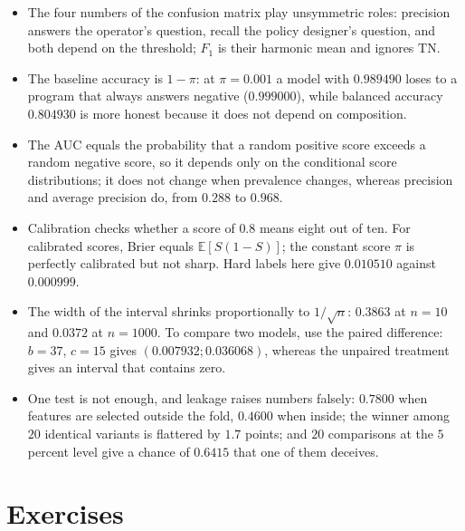 \begin{ringkasan}
\begin{itemize}
  \item The four numbers of the confusion matrix play unsymmetric roles: precision answers the
        operator's question, recall the policy designer's question, and both depend on the
        threshold; $F_1$ is their harmonic mean and ignores $\mathrm{TN}$.
  \item The baseline accuracy is $1-\pi$: at $\pi=0.001$ a model with $0.989490$ loses to a program
        that always answers negative ($0.999000$), while balanced accuracy $0.804930$ is more honest
        because it does not depend on composition.
  \item The AUC equals the probability that a random positive score exceeds a random negative
        score, so it depends only on the conditional score distributions; it does not change when
        prevalence changes, whereas precision and average precision do, from $0.288$ to $0.968$.
  \item Calibration checks whether a score of $0.8$ means eight out of ten. For calibrated scores,
        Brier equals $\mathbb{E}[S(1-S)]$; the constant score $\pi$ is perfectly calibrated but not
        sharp. Hard labels here give $0.010510$ against $0.000999$.
  \item The width of the interval shrinks proportionally to $1/\sqrt n$: $0.3863$ at $n=10$ and
        $0.0372$ at $n=1000$. To compare two models, use the paired difference: $b=37$, $c=15$
        gives $(0.007932;0.036068)$, whereas the unpaired treatment gives an interval that contains
        zero.
  \item One test is not enough, and leakage raises numbers falsely: $0.7800$ when features are
        selected outside the fold, $0.4600$ when inside; the winner among $20$ identical variants is
        flattered by $1.7$ points; and $20$ comparisons at the $5$ percent level give a chance of
        $0.6415$ that one of them deceives.
\end{itemize}
\end{ringkasan}

\section{Exercises}


